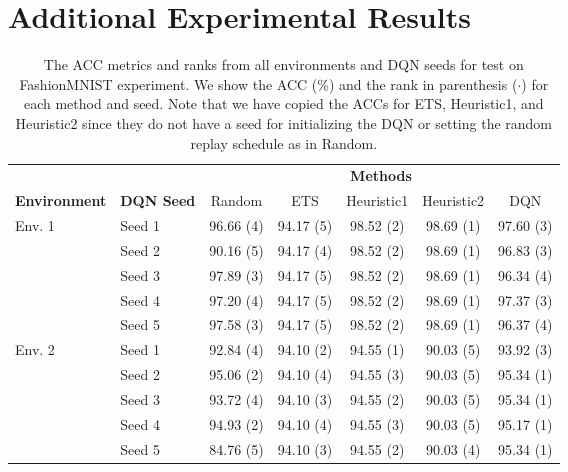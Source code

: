 
\section{Additional Experimental Results}\label{app:additional_experimental_results}

\begin{table}[t]
    \scriptsize
    \centering
    \caption{The ACC metrics and ranks from all environments and DQN seeds for test on FashionMNIST experiment. We show the ACC (\%) and the rank in parenthesis ($\cdot$) for each method and seed. Note that we have copied the ACCs for ETS, Heuristic1, and Heuristic2 since they do not have a seed for initializing the DQN or setting the random replay schedule as in Random.  }
    \begin{tabular}{l l c c c c c}
        \toprule
        & & \multicolumn{5}{c}{{\bf Methods}} \\
        \cmidrule{3-7}
        {\bf Environment} & {\bf DQN Seed} & Random & ETS & Heuristic1 & Heuristic2 & DQN \\
        \midrule 
         \multirow{5}{*}{Env. 1} & Seed 1 & 96.66 (4) & 94.17 (5) & 98.52 (2) & 98.69 (1) & 97.60 (3)  \\
         \cmidrule{2-7}
         & Seed 2 & 90.16 (5) & 94.17 (4) & 98.52 (2) & 98.69 (1) & 96.83 (3)  \\
         \cmidrule{2-7}
         & Seed 3 & 97.89 (3) & 94.17 (5) & 98.52 (2) & 98.69 (1) & 96.34 (4)  \\
         \cmidrule{2-7}
         & Seed 4 & 97.20 (4) & 94.17 (5) & 98.52 (2) & 98.69 (1) & 97.37 (3) \\
         \cmidrule{2-7}
         & Seed 5 & 97.58 (3) & 94.17 (5) & 98.52 (2) & 98.69 (1) & 96.37 (4)  \\
        \midrule
         \multirow{5}{*}{Env. 2} & Seed 1 & 92.84 (4) & 94.10 (2) & 94.55 (1) & 90.03 (5) & 93.92 (3)  \\
         \cmidrule{2-7}
         & Seed 2 & 95.06 (2) & 94.10 (4) & 94.55 (3) & 90.03 (5) & 95.34 (1)   \\
         \cmidrule{2-7}
         & Seed 3 & 93.72 (4) & 94.10 (3) & 94.55 (2) & 90.03 (5) & 95.34 (1)  \\
         \cmidrule{2-7}
         & Seed 4 & 94.93 (2) & 94.10 (4) & 94.55 (3) & 90.03 (5) & 95.17 (1) \\
         \cmidrule{2-7}
         & Seed 5 & 84.76 (5) & 94.10 (3) & 94.55 (2) & 90.03 (4) & 95.34 (1)  \\

\end{tabular}
\end{table}
